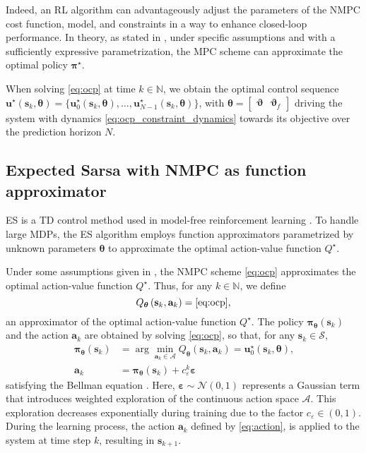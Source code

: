 \documentclass[letterpaper, 10pt, conference]{ieeeconf}
\begin{document}
Indeed, an RL algorithm can advantageously adjust the parameters of the NMPC cost function, model, and constraints in a way to enhance closed-loop performance.
In theory, as stated in \cite[Theorem 1]{gros2019data}, under specific assumptions and with a sufficiently expressive parametrization, the MPC scheme can approximate the optimal policy $\boldsymbol{\pi}^{\star}$.

When solving \eqref{eq:ocp} at time $k\in\mathbb{N}$, we obtain the optimal control sequence $\mathbf{u}^{\star}(\mathbf{s}_k, \boldsymbol{\theta}) = \{\mathbf{u}^{\star}_0(\mathbf{s}_k, \boldsymbol{\theta}),\ldots,\mathbf{u}^{\star}_{N-1}(\mathbf{s}_k, \boldsymbol{\theta})\}$, with $\boldsymbol{\theta} = \begin{bmatrix}\boldsymbol{\vartheta} & \boldsymbol{\vartheta}_f\end{bmatrix}$ driving the system with dynamics \eqref{eq:ocp_constraint_dynamics} towards its objective over the prediction horizon $N$.

	\subsection{Expected Sarsa with NMPC as function approximator}
		\label{subsection:double_expected_sarsa}

ES is a TD control method used in model-free reinforcement learning \cite{sutton2018reinforcement}.
To handle large MDPs, the ES algorithm employs function approximators parametrized by unknown parameters $\boldsymbol{\theta}$ to approximate the optimal action-value function $Q^{\star}$.

Under some assumptions given in \cite{gros2019data}, the NMPC scheme \eqref{eq:ocp} approximates the optimal action-value function $Q^{\star}$.
Thus, for any $k\in\mathbb{N}$, we define
	\begin{equation}\label{eq:mpc_qfunction}
		Q_{\boldsymbol{\theta}}\left(\mathbf{s}_k, \mathbf{a}_k\right) = \eqref{eq:ocp}\text{,}
	\end{equation}
an approximator of the optimal action-value function $Q^{\star}$.
The policy $\boldsymbol{\pi_{\theta}}(\mathbf{s}_k)$ and the action $\mathbf{a}_k$ are obtained by solving \eqref{eq:ocp}, so that, for any $\mathbf{s}_k\in\mathcal{S}$, 
\begin{align} 
	\label{eq:policy_function}
		\boldsymbol{\pi}_{\boldsymbol{\theta}}(\mathbf{s}_k) & = \arg\min_{\mathbf{a}_k\in\mathcal{A}} Q_{\boldsymbol{\theta}}(\mathbf{s}_k, \mathbf{a}_k) = \mathbf{u}_0^{\star}(\mathbf{s}_k, \boldsymbol{\theta})
	\text{,}\\
	\label{eq:action}
		\mathbf{a}_k  & = \boldsymbol{\pi_{\theta}}(\mathbf{s}_k) + c_\varepsilon^{k}\boldsymbol{\varepsilon}
\end{align}
satisfying the Bellman equation \cite{sutton2018reinforcement}. 
Here, $\boldsymbol{\varepsilon} \sim\mathcal{N}(0, \num{1})$ represents a Gaussian term that introduces weighted exploration of the continuous action space $\mathcal{A}$.
This exploration decreases exponentially during training due to the factor $c_{\varepsilon}\in(0, 1)$.
During the learning process, the action $\mathbf{a}_k$ defined by \eqref{eq:action}, is applied to the system at time step $k$, resulting in $\mathbf{s}_{k + 1}$.
 
\end{document}
